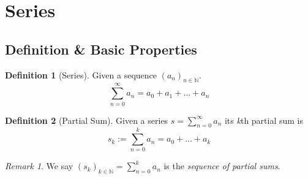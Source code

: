 \documentclass[english,titlepage]{uzhpub}
\theoremstyle{definition}
\newtheorem{definition}{Definition}[section]
\theoremstyle{plain}
\theoremstyle{remark}
\newtheorem*{remark}{Remark}
\theoremstyle{example}
\begin{document}
   \section{Series}
   \subsection{Definition \& Basic Properties}
   \begin{definition}[Series]
      Given a sequence \((a_n)_{n \in \mathbb{N}}\).
      \[\sum_{n=0}^{\infty} a_n = a_0 + a_1 + \ldots + a_n\]
   \end{definition}

   \begin{definition}[Partial Sum]
      Given a series \(s = \sum_{n = 0}^{\infty} a_n\) its \textit{k}th partial sum is
      \[s_k := \sum_{n = 0}^{k} a_n = a_0 + \ldots + a_k\]
   \end{definition}
   \begin{remark}
      We say \((s_k)_{k \in \mathbb{N}} = \sum_{n=0}^k a_n\) is the \textit{sequence of partial sums}.
   \end{remark}
\end{document}
